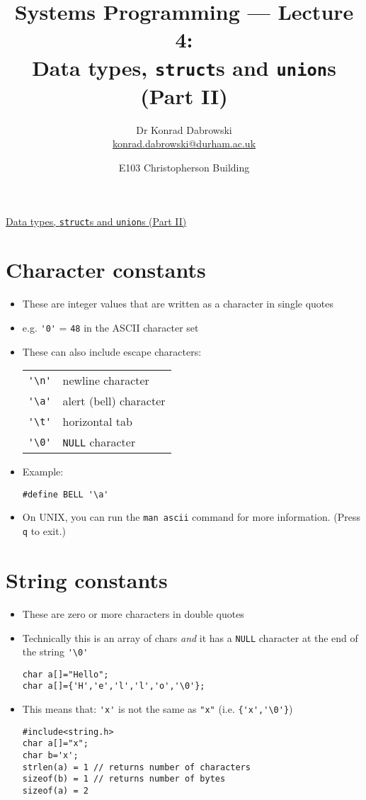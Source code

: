 \documentclass{article}
\title{Systems Programming --- Lecture 4:\\
Data types, \texttt{struct}s and \texttt{union}s (Part II)}
\author{Dr Konrad Dabrowski\\
\href{mailto://konrad.dabrowski@durham.ac.uk}{konrad.dabrowski@durham.ac.uk}
}
\date{E103 Christopherson Building
}
\begin{document}
\begin{center}
\underline{\huge Data types, \texttt{struct}s and \texttt{union}s (Part II)}
\end{center}
\section{Character constants}
\begin{itemize}
\item These are integer values that are written as a character in single quotes
\item e.g. \verb!'0'! = \verb!48! in the ASCII  character set

\item These can also include escape characters:
\begin{tabular}{ll}
\verb!'\n'! & newline character\\
\verb!'\a'! & alert (bell) character\\
\verb!'\t'! & horizontal tab\\
\verb!'\0'! & \verb!NULL! character
\end{tabular}

\item Example:
\begin{verbatim}
#define BELL '\a'
\end{verbatim}

\item On UNIX, you can run the \verb!man ascii! command for more information. (Press \verb!q! to exit.)
\end{itemize}



\section{String constants}
\begin{itemize}
\item These are zero or more characters in double quotes
\item Technically this is an array of chars \emph{and} it has a \verb!NULL! character at the end of the string \verb!'\0'!
\begin{verbatim}
char a[]="Hello";
char a[]={'H','e','l','l','o','\0'};
\end{verbatim}
\item This means that:
\verb!'x'! is not the same as \verb!"x"! (i.e. \verb!{'x','\0'}!)

\begin{verbatim}
#include<string.h>
char a[]="x";
char b='x';
strlen(a) = 1 // returns number of characters
sizeof(b) = 1 // returns number of bytes
sizeof(a) = 2
\end{verbatim}
\end{itemize}
\end{document}

